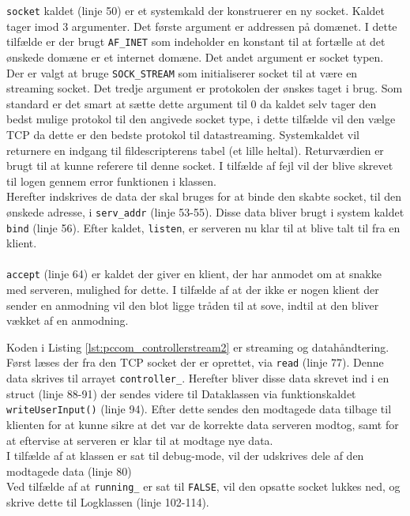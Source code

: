 

\texttt{socket} kaldet (linje 50) er et systemkald der konstruerer en ny socket. Kaldet tager imod 3 argumenter. Det første argument er addressen på domænet. I dette tilfælde er der brugt \texttt{AF\_INET} som indeholder en konstant til at fortælle at det ønskede domæne er et internet domæne. Det andet argument er socket typen. Der er valgt at bruge \texttt{SOCK\_STREAM} som initialiserer socket til at være en streaming socket. Det tredje argument er protokolen der ønskes taget i brug. Som standard er det smart at sætte dette argument til 0 da kaldet selv tager den bedst mulige protokol til den angivede socket type, i dette tilfælde vil den vælge TCP da dette er den bedste protokol til datastreaming. Systemkaldet vil returnere en indgang til fildescripterens tabel (et lille heltal). Returværdien er brugt til at kunne referere til denne socket. I tilfælde af fejl vil der blive skrevet til logen gennem error funktionen i klassen.\\
Herefter indskrives de data der skal bruges for at binde den skabte socket, til den ønskede adresse, i \texttt{serv\_addr} (linje 53-55). Disse data bliver brugt i system kaldet \texttt{bind} (linje 56). Efter kaldet, \texttt{listen}, er serveren nu klar til at blive talt til fra en klient.\\\\
\texttt{accept} (linje 64) er kaldet der giver en klient, der har anmodet om at snakke med serveren, mulighed for dette. I tilfælde af at der ikke er nogen klient der sender en anmodning vil den blot ligge tråden til at sove, indtil at den bliver vækket af en anmodning.



Koden i Listing \ref{lst:pccom_controllerstream2} er streaming og datahåndtering. Først læses der fra den TCP socket der er oprettet, via \texttt{read} (linje 77). Denne data skrives til arrayet \texttt{controller\_}. Herefter bliver disse data skrevet ind i en struct (linje 88-91) der sendes videre til Dataklassen via funktionskaldet \texttt{writeUserInput()} (linje 94). Efter dette sendes den modtagede data tilbage til klienten for at kunne sikre at det var de korrekte data serveren modtog, samt for at eftervise at serveren er klar til at modtage nye data.\\
I tilfælde af at klassen er sat til debug-mode, vil der udskrives dele af den modtagede data (linje 80)\\
Ved tilfælde af at \texttt{running\_} er sat til \texttt{FALSE}, vil den opsatte socket lukkes ned, og skrive dette til Logklassen (linje 102-114).

